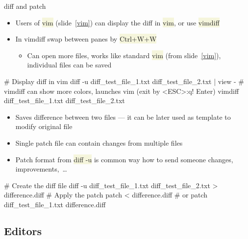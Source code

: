 \documentclass[compress, ucs, xelatex, 11pt, xcolor=svgnames, aspectratio=169,
	hyperref={
		bookmarks=true,
		unicode=true,
		colorlinks=true,
		pdftitle={Linux, command line and MetaCentrum},
		plainpages=false,
		pdfauthor={Vojtech Zeisek},
		pdfsubject={Course about use of Linux command line, writing shell scripts and using MetaCentrum of CESNET},
		pdfcreator={XeLaTeX},
		pdfkeywords={Linux, GNU, BASH, shell, command line, MetaCentrum},
		linkcolor=DarkRed, %
		anchorcolor=DarkBlue, %
		citecolor=Indigo, %
		filecolor=NavyBlue, %
		menucolor=DarkMagenta, %
		urlcolor=DarkBlue, %
		pdftex},
	url={hyphens, lowtilde} %
	]{beamer}
\renewcommand{\texttt}[1]{\colorbox{Beige}{{\ttfamily #1}}}
\begin{document}
\begin{frame}[fragile]{diff and patch}
	\begin{itemize}
		\item Users of \texttt{vim} (slide~\ref{vim}) can display the diff in \texttt{vim}, or use \texttt{vimdiff}
		\item In vimdiff swap between panes by \texttt{Ctrl+W+W}
		\begin{itemize}
			\item Can open more files, works like standard \texttt{vim} (from slide~\ref{vim}), individual files can be saved
		\end{itemize}
	\end{itemize}
	\vfill
	\begin{bashcode}
    # Display diff in vim
    diff -u diff_test_file_1.txt diff_test_file_2.txt | view -
    # vimdiff can show more colors, launches vim (exit by <ESC>:q! Enter)
    vimdiff diff_test_file_1.txt diff_test_file_2.txt
	\end{bashcode}
	\vfill
	\begin{itemize}
		\item Saves difference between two files --- it can be later used as template to modify original file
		\item Single patch file can contain changes from multiple files
		\item Patch format from \texttt{diff -u} is common way how to send someone changes, improvements,~\ldots
	\end{itemize}
	\vfill
	\begin{bashcode}
    # Create the diff file
    diff -u diff_test_file_1.txt diff_test_file_2.txt > difference.diff
    # Apply the patch
    patch < difference.diff # or
    patch diff_test_file_1.txt difference.diff
	\end{bashcode}
\end{frame}

\subsection{Editors}
\end{document}
